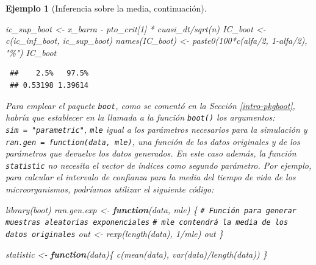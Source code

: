 \documentclass[
  10pt,
]{book}
\newenvironment{Shaded}{\begin{snugshade}}{\end{snugshade}}
\newcommand{\CommentTok}[1]{\textcolor[rgb]{0.56,0.35,0.01}{\textit{#1}}}
\newcommand{\ControlFlowTok}[1]{\textcolor[rgb]{0.13,0.29,0.53}{\textbf{#1}}}
\newcommand{\DecValTok}[1]{\textcolor[rgb]{0.00,0.00,0.81}{#1}}
\newcommand{\FunctionTok}[1]{\textcolor[rgb]{0.00,0.00,0.00}{#1}}
\newcommand{\NormalTok}[1]{#1}
\newcommand{\OtherTok}[1]{\textcolor[rgb]{0.56,0.35,0.01}{#1}}
\newcommand{\SpecialCharTok}[1]{\textcolor[rgb]{0.00,0.00,0.00}{#1}}
\newcommand{\StringTok}[1]{\textcolor[rgb]{0.31,0.60,0.02}{#1}}
\theoremstyle{break}
\newtheorem{example}{Ejemplo}[chapter]
\theoremstyle{nonumberplain}
\renewcommand{\CommentTok}[1]{\textcolor[rgb]{0.41,0.41,0.41}{\texttt{#1}}}
\begin{document}
\begin{example}[Inferencia sobre la media, continuación]
\begin{Shaded}
\begin{Highlighting}[]
\NormalTok{ic\_sup\_boot }\OtherTok{\textless{}{-}}\NormalTok{ x\_barra }\SpecialCharTok{{-}}\NormalTok{ pto\_crit[}\DecValTok{1}\NormalTok{] }\SpecialCharTok{*}\NormalTok{ cuasi\_dt}\SpecialCharTok{/}\FunctionTok{sqrt}\NormalTok{(n)}
\NormalTok{IC\_boot }\OtherTok{\textless{}{-}} \FunctionTok{c}\NormalTok{(ic\_inf\_boot, ic\_sup\_boot)}
\FunctionTok{names}\NormalTok{(IC\_boot) }\OtherTok{\textless{}{-}} \FunctionTok{paste0}\NormalTok{(}\DecValTok{100}\SpecialCharTok{*}\FunctionTok{c}\NormalTok{(alfa}\SpecialCharTok{/}\DecValTok{2}\NormalTok{, }\DecValTok{1}\SpecialCharTok{{-}}\NormalTok{alfa}\SpecialCharTok{/}\DecValTok{2}\NormalTok{), }\StringTok{"\%"}\NormalTok{)}
\NormalTok{IC\_boot}
\end{Highlighting}
\end{Shaded}

\begin{verbatim}
 ##    2.5%   97.5% 
 ## 0.53198 1.39614
\end{verbatim}

Para emplear el paquete \texttt{boot}, como se comentó en la Sección
\ref{intro-pkgboot}, habría que establecer en la llamada a la
función \texttt{boot()} los argumentos: \texttt{sim\ =\ "parametric"},
\texttt{mle} igual a los parámetros necesarios para la simulación y
\texttt{ran.gen\ =\ function(data,\ mle)}, una función de los datos originales
y de los parámetros que devuelve los datos generados.
En este caso además, la función \texttt{statistic} no necesita el vector
de índices como segundo parámetro.
Por ejemplo, para calcular el intervalo de confianza para la media del
tiempo de vida de los microorganismos, podríamos utilizar el siguiente código:

\begin{Shaded}
\begin{Highlighting}[]
\FunctionTok{library}\NormalTok{(boot)}
\NormalTok{ran.gen.exp }\OtherTok{\textless{}{-}} \ControlFlowTok{function}\NormalTok{(data, mle) \{}
    \CommentTok{\# Función para generar muestras aleatorias exponenciales}
    \CommentTok{\# mle contendrá la media de los datos originales}
\NormalTok{    out }\OtherTok{\textless{}{-}} \FunctionTok{rexp}\NormalTok{(}\FunctionTok{length}\NormalTok{(data), }\DecValTok{1}\SpecialCharTok{/}\NormalTok{mle)}
\NormalTok{    out}
\NormalTok{\}}

\NormalTok{statistic }\OtherTok{\textless{}{-}} \ControlFlowTok{function}\NormalTok{(data)\{}
    \FunctionTok{c}\NormalTok{(}\FunctionTok{mean}\NormalTok{(data), }\FunctionTok{var}\NormalTok{(data)}\SpecialCharTok{/}\FunctionTok{length}\NormalTok{(data))}
\NormalTok{\}}


\end{Highlighting}
\end{Shaded}
\end{example}
\end{document}
